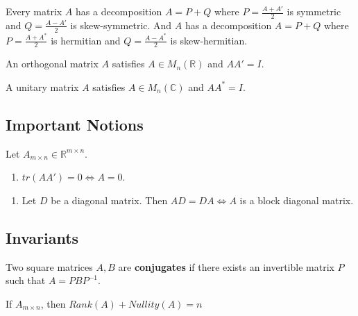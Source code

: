 \begin{note}
	Every matrix $A$ has a decomposition $A=P+Q$ where $P = \frac{A+A'}{2}$ is symmetric and $Q = \frac{A-A'}{2}$ is skew-symmetric.
	And $A$ has a decomposition $A = P + Q$ where $P = \frac{A+A^\ast}{2}$ is hermitian and $Q = \frac{A-A^\ast}{2}$ is skew-hermitian.
\end{note}

\begin{definition}[orthogonal]
	An orthogonal matrix $A$ satisfies $A \in M_n(\mathbb{R})$ and $AA' = I$.
\end{definition}

\begin{definition}[unitary]
	A unitary matrix $A$ satisfies $A \in M_n(\mathbb{C})$ and $AA^\ast = I$.
\end{definition}

\subsection{Important Notions}
\par
Let $A_{m \times n} \in \mathbb{R}^{m \times n}$.
\begin{enumerate}
	\item $tr(AA') = 0 \iff A = 0$.
\end{enumerate}

\par
	\begin{enumerate}
		\item Let $D$ be a diagonal matrix.
			Then $AD = DA \iff A$ is a block diagonal matrix.
	\end{enumerate}

\subsection{Invariants}
\begin{definition}[conjugation]
	Two square matrices $A,B$ are \textbf{conjugates} if there exists an invertible matrix $P$ such that $A = PBP^{-1}$.
\end{definition}

\begin{theorem}
	If $A_{m \times n}$, then $Rank(A) + Nullity(A) = n$
\end{theorem}
